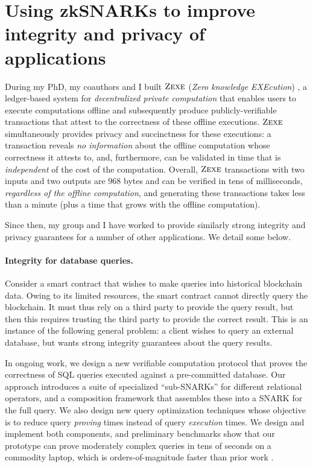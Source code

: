 \documentclass[11pt,letterpaper]{article}
\theoremstyle{definition} %
\theoremstyle{remark} %
\newcommand{\zexe}{\textsc{Zexe}}
\begin{document}
\section{Using zkSNARKs to improve integrity and privacy of applications}
\label{sec:applications}

During my PhD, my coauthors and I built $\zexe$ (\emph{Zero knowledge EXEcution}) \cite{BoweCGMMW20}, a ledger-based system for \emph{decentralized private computation} that enables users to execute computations offline and subsequently produce publicly-verifiable transactions that attest to the correctness of these offline executions. 
$\zexe$ simultaneously provides privacy and succinctness for these executions: a transaction reveals \emph{no information} about the offline computation whose correctness it attests to, and, furthermore, can be validated in time that is \emph{independent} of the cost of the computation. 
Overall, $\zexe$ transactions with two inputs and two outputs are $968$ bytes and can be verified in tens of milliseconds, \emph{regardless of the offline computation}, and generating these transactions takes less than a minute (plus a time that grows with the offline computation). 

Since then, my group and I have worked to provide similarly strong integrity and privacy guarantees for a number of other applications. We detail some below.



\paragraph{Integrity for database queries.}
Consider a smart contract that wishes to make queries into historical blockchain data.
Owing to its limited resources, the smart contract cannot directly query the blockchain.
It must thus rely on a third party to provide the query result, but then this requires trusting the third party to provide the correct result.
This is an instance of the following general problem: a client wishes to query an external database, but wants strong integrity guarantees about the query results.

In ongoing work, we design a new verifiable computation protocol that proves the correctness of SQL queries executed against a pre-committed database. 
Our approach introduces a suite of specialized ``sub-SNARKs'' for different relational operators, and a composition framework that assembles these into a SNARK for the full query. 
We also design new query optimization techniques whose objective is to reduce query \emph{proving} times instead of query \emph{execution} times.
We design and implement both components, and preliminary benchmarks show that our prototype can prove moderately complex queries in tens of seconds on a commodity laptop, which is orders-of-magnitude faster than prior work \cite{ZhangGKPP17}.
\end{document}

